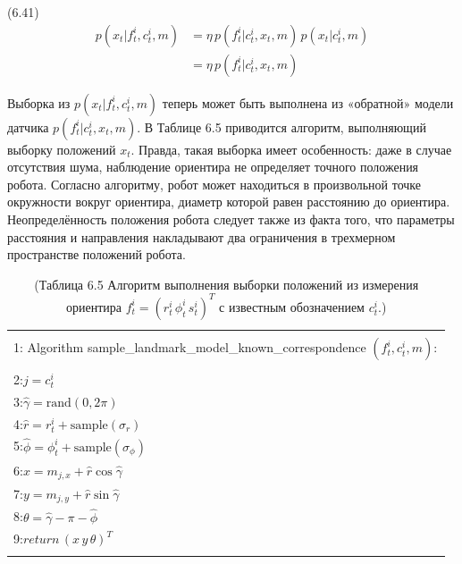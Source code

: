 \documentclass[10pt,a4paper]{article}
\begin{document}
(6.41)
\begin{equation*}
\begin{split}
p(x_t|f_t^i,c_t^i,m)&=\eta\,p(f_t^i|c_t^i,x_t,m)\,p(x_t|c_t^i,m)\\
&=\eta\,p(f_t^i|c_t^i,x_t,m)
\end{split}
\end{equation*}

Выборка из $p(x_t | f_t^i, c^i_t, m)$ теперь может быть выполнена из  «обратной» модели датчика $p(f_t^i | c^i_t, x_t, m)$. В Таблице 6.5 приводится алгоритм, выполняющий выборку положений $x_t$. Правда, такая выборка имеет особенность: даже в случае отсутствия шума, наблюдение ориентира не определяет точного положения робота. Согласно алгоритму, робот может находиться в произвольной точке окружности вокруг ориентира, диаметр которой равен расстоянию до ориентира. Неопределённость положения робота следует также из факта того, что параметры расстояния и направления накладывают два ограничения в трехмерном пространстве положений робота.

\begin{table}[H]
\begin{center}
\begin{tabular}{|l|}
\hline
{}\\
1: \hspace{3mm} Algorithm sample\_landmark\_model\_known\_correspondence $(f_t^i,c_t^i,m):$ \\
{}\\
2:\hspace{7mm}$j=c_t^i$\\
3:\hspace{7mm}$\hat{\gamma}=\text{rand}(0,2\pi)$\\
4:\hspace{7mm}$\hat{r}=r_t^i+\text{sample}(\sigma_r)$\\
5:\hspace{7mm}$\hat{\phi}=\phi_t^i+\text{sample}(\sigma_\phi)$\\
6:\hspace{7mm}$x=m_{j,x}+\hat{r}\cos\hat{\gamma}$\\
7:\hspace{7mm}$y=m_{j,y}+\hat{r}\sin\hat{\gamma}$\\
8:\hspace{7mm}$\theta=\hat{\gamma}-\pi-\hat{\phi}$\\
9:\hspace{7mm}$\textit{return}\,(x\,y\,\theta)^T$\\
{}\\
\hline
\end{tabular}
\caption{(Таблица 6.5 Алгоритм выполнения выборки положений из измерения ориентира $f_t^i = (r_t^i\, \phi^i_t\, s^i_t)^T$ с известным обозначением  $c^i_t$.)}
\end{center}
\end{table}
\end{document}
